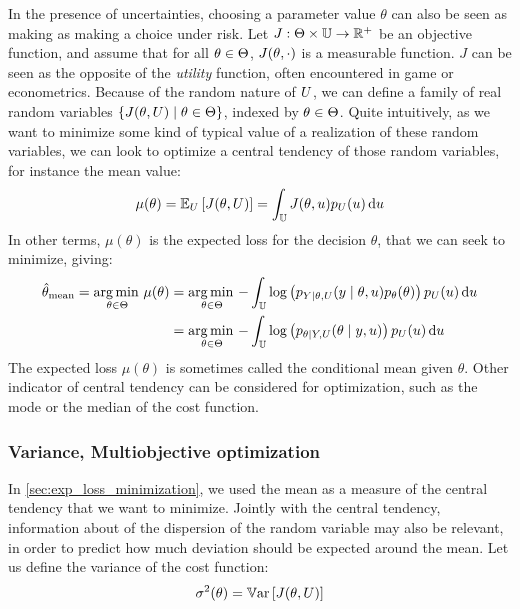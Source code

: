 \documentclass[../../Main_ManuscritThese.tex]{subfiles}
\begin{document}
In the presence of uncertainties, choosing a parameter value $\theta$ can also be seen as making as making a choice under risk. Let $J:\Theta \times \mathbb{U}\rightarrow \mathbb{R}^+$ be an objective function, and assume that for all $\theta \in \Theta$, $J(\theta, \cdot)$ is a measurable function. $J$ can be seen as the opposite of the \emph{utility} function, often encountered in game or econometrics.
Because of the random nature of $U$, we can define a family of real random variables $\{J(\theta,U) \mid \theta \in \Theta\}$, indexed by $\theta \in \Theta$. Quite intuitively, as we want to minimize some kind of typical value of a realization of these random variables, we can look to optimize a central tendency of those random variables, for instance the mean value:
\begin{equation}
  \mu(\theta) = \mathbb{E}_U\left[J(\theta,U)\right] =\int_{\mathbb{U}} J(\theta,u)p_U(u)\,\mathrm{d}u
\end{equation}
In other terms, $\mu(\theta)$ is the expected loss for the decision $\theta$, that we can seek to minimize, giving:
\begin{align}
  \hat{\theta}_{\mathrm{mean}} = \operatorname*{arg\,min \,}_{\theta\in\Theta} \mu(\theta)&= \operatorname*{arg\,min \,}_{\theta\in\Theta}-\int_{\mathbb{U}}\log\left(p_{Y \mid \theta,U}(y \mid \theta,u)p_{\theta}(\theta)\right)p_{U}(u)\,\mathrm{d}u \\
                     &= \operatorname*{arg\,min \,}_{\theta\in\Theta}-\int_{\mathbb{U}}\log\left(p_{\theta \mid Y,U}(\theta \mid y,u)\right)p_{U}(u)\,\mathrm{d}u 
\end{align}
The expected loss $\mu(\theta)$ is sometimes called the conditional mean given $\theta$.
Other indicator of central tendency can be considered for optimization, such as the mode or the median of the cost function. 

\subsubsection{Variance, Multiobjective optimization}
\label{sec:multiobjective_optimization}
In \cref{sec:exp_loss_minimization}, we used the mean as a measure of the central tendency that we want to minimize. Jointly with the central tendency,  information about of the dispersion of the random variable may also be relevant, in order to predict how much deviation should be expected around the mean.
Let us define the variance of the cost function:
\begin{equation}
  \sigma^2(\theta) = \mathbb{V}\mathrm{ar}\left[J(\theta,U)\right]
\end{equation}
\end{document}
